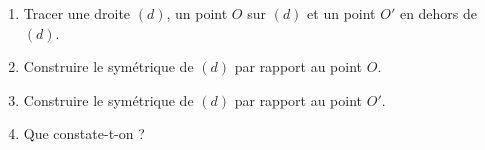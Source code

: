 
\begin{exercice}\label{exosmath-0990}

    \begin{enumerate}
        \item
            Tracer une droite \( (d)\), un point \( O\) sur \( (d)\) et un point \( O'\) en dehors de \( (d)\).
        \item
            Construire le symétrique de \( (d)\) par rapport au point \( O\).
        \item
            Construire le symétrique de \( (d)\) par rapport au point \( O'\).
        \item
            Que constate-t-on ?
    \end{enumerate}

\end{exercice}
